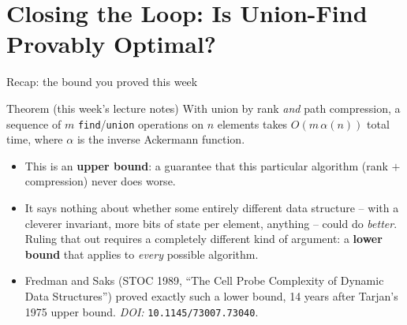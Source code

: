 \documentclass[11pt,aspectratio=169]{beamer}
\begin{document}
\section{Closing the Loop: Is Union-Find Provably Optimal?}

\begin{frame}{Recap: the bound you proved this week}
  \begin{block}{Theorem (this week's lecture notes)}
    With union by rank \emph{and} path compression, a sequence of $m$
    \texttt{find}/\texttt{union} operations on $n$ elements takes $O(m\,\alpha(n))$
    total time, where $\alpha$ is the inverse Ackermann function.
  \end{block}
  \begin{itemize}
    \item This is an \textbf{upper bound}: a guarantee that this particular algorithm
    (rank $+$ compression) never does worse.
    \item It says nothing about whether some entirely different data structure --
    with a cleverer invariant, more bits of state per element, anything -- could do
    \emph{better}. Ruling that out requires a completely different kind of argument:
    a \textbf{lower bound} that applies to \emph{every} possible algorithm.
    \item Fredman and Saks (STOC 1989, ``The Cell Probe Complexity of Dynamic Data
    Structures'') proved exactly such a lower bound, 14 years after Tarjan's 1975
    upper bound. \emph{DOI:} \texttt{10.1145/73007.73040}.
  \end{itemize}
\end{frame}
\end{document}
